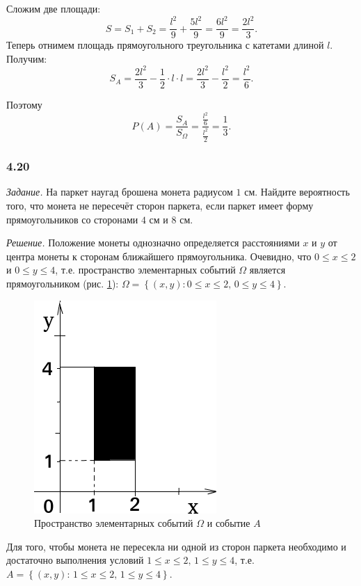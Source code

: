 Сложим две площади:
$$S =
S_1 + S_2 = 
\frac{l^2}{9} + \frac{5 l^2}{9} =
\frac{6 l^2}{9} =
\frac{2 l^2}{3}.$$
Теперь отнимем площадь прямоугольного треугольника с катетами длиной $l$.
Получим:
$$S_A =
\frac{2 l^2}{3} - \frac{1}{2} \cdot l \cdot l =
\frac{2 l^2}{3} - \frac{l^2}{2} =
\frac{l^2}{6}.$$

Поэтому
$$P \left( A \right) =
\frac{S_A}{S_{ \Omega }} =
\frac{ \frac{l^2}{6} }{ \frac{l^2}{2} } =
\frac{1}{3}.$$

\subsubsection*{4.20}

\textit{Задание.} На паркет наугад брошена монета радиусом $1$ см.
Найдите вероятность того, что монета не пересечёт сторон паркета, если паркет имеет форму прямоугольников со сторонами $4$ см и $8$ см.

\textit{Решение.} Положение монеты однозначно определяется расстояниями $x$ и $y$ от центра монеты к сторонам ближайшего прямоугольника.
Очевидно, что $0 \leq x \leq 2$ и $0 \leq y \leq 4$, т.е. пространство элементарных событий $ \Omega $ является прямоугольником (рис. \ref{fig:420}):
$ \Omega =
\left\{ \left( x, y \right): 0 \leq x \leq 2, \, 0 \leq y \leq 4 \right\}$.

\begin{figure}[h!]
  \centering
  \includegraphics[width=.5\textwidth]{./pictures/4_20.png}
  \caption{Пространство элементарных событий $ \Omega $ и событие $A$}
  \label{fig:420}
\end{figure}

Для того,
чтобы монета не пересекла ни одной из сторон паркета необходимо и достаточно выполнения условий
$1 \leq x \leq 2, \, 1 \leq y \leq 4$, т.е. $A = \left\{ \left( x, y \right): \, 1 \leq x \leq 2, \, 1 \leq y \leq 4 \right\} $.

